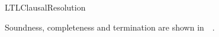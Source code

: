 \begin{entry}{LTLClausalResolution}
\begin{technicalities}
Soundness, completeness and termination are shown in~~\cite{FDP01}.
\end{technicalities}



%
%
%
%
%
%
% 
%












\end{entry}
